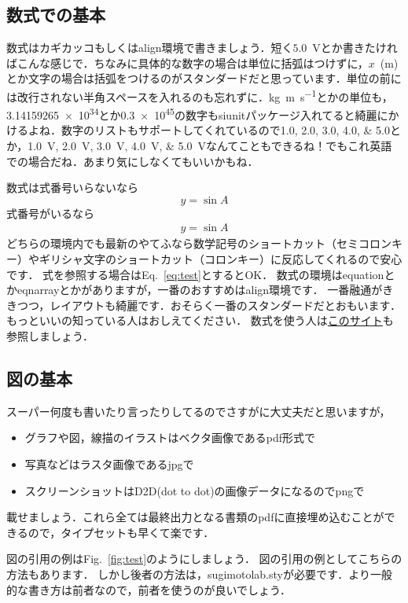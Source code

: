 \documentclass{jlreq}%
\numberwithin{equation}{section}%
\begin{document}
\subsection{数式での基本}

数式はカギカッコもしくはalign環境で書きましょう．短く$5.0$~Vとか書きたければこんな感じで．ちなみに具体的な数字の場合は単位に括弧はつけずに，$x$~(m)とか文字の場合は括弧をつけるのがスタンダードだと思っています．単位の前には改行されない半角スペースを入れるのも忘れずに．\si{kg.m.s^{-1}}とかの単位も，\num{3.14159265e34}とか\num{.3e45}の数字もsiunitパッケージ入れてると綺麗にかけるよね．数字のリストもサポートしてくれているので\numlist{ 1.0; 2.0; 3.0; 4.0; 5.0}とか，\SIlist{ 1.0; 2.0; 3.0; 4.0; 5.0}{\volt}なんてこともできるね！でもこれ英語での場合だね．あまり気にしなくてもいいかもね．

数式は式番号いらないなら
\[
    y=\sin{A}
\]
式番号がいるなら
\begin{align}
    y=\sin{A}
    \label{eq:test}
\end{align}
どちらの環境内でも最新のやてふなら数学記号のショートカット（セミコロンキー）やギリシャ文字のショートカット（コロンキー）に反応してくれるので安心です．
式を参照する場合はEq.~\ref{eq:test}とするとOK．
数式の環境はequationとかeqnarrayとかがありますが，一番のおすすめはalign環境です．
一番融通がききつつ，レイアウトも綺麗です．おそらく一番のスタンダードだとおもいます．もっといいの知っている人はおしえてください．
数式を使う人は\href{http://www.math.tohoku.ac.jp/~kuroki/LaTeX/howtolatex.html}{このサイト}も参照しましょう．


\subsection{図の基本}

スーパー何度も書いたり言ったりしてるのでさすがに大丈夫だと思いますが，
\begin{itemize}
    \item グラフや図，線描のイラストはベクタ画像であるpdf形式で
    \item 写真などはラスタ画像であるjpgで
    \item スクリーンショットはD2D(dot to dot)の画像データになるのでpngで
\end{itemize}
載せましょう．これら全ては最終出力となる書類のpdfに直接埋め込むことができるので，タイプセットも早くて楽です．

図の引用の例はFig.~\ref{fig:test}のようにしましょう．
図の引用の例としてこちらの方法もあります．
しかし後者の方法は，sugimotolab.styが必要です．より一般的な書き方は前者なので，前者を使うのが良いでしょう．
\end{document}

